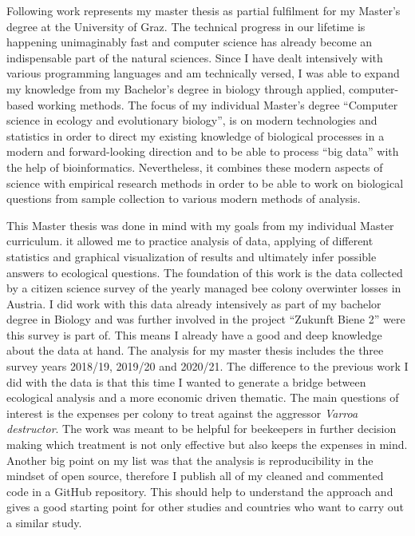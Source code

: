 \label{sec:Preface}

Following work represents my master thesis as partial fulfilment for my Master's degree at the University of Graz. The technical progress in our lifetime is happening unimaginably fast and computer science has already become an indispensable part of the natural sciences. Since I have dealt intensively with various programming languages and am technically versed, I was able to expand my knowledge from my Bachelor's degree in biology through applied, computer-based working methods. The focus of my individual Master's degree \enquote{Computer science in ecology and evolutionary biology}, is on modern technologies and statistics in order to direct my existing knowledge of biological processes in a modern and forward-looking direction and to be able to process \enquote{big data} with the help of bioinformatics. Nevertheless, it combines these modern aspects of science with empirical research methods in order to be able to work on biological questions from sample collection to various modern methods of analysis. 

This Master thesis was done in mind with my goals from my individual Master curriculum. it allowed me to practice analysis of data, applying of different statistics and graphical visualization of results and ultimately infer possible answers to ecological questions. The foundation of this work is the data collected by a citizen science survey of the yearly managed bee colony overwinter losses in Austria. I did work with this data already intensively as part of my bachelor degree in Biology and was further involved in the project \enquote{Zukunft Biene 2} were this survey is part of. This means I already have a good and deep knowledge about the data at hand. The analysis for my master thesis includes the three survey years 2018/19, 2019/20 and 2020/21. The difference to the previous work I did with the data is that this time I wanted to generate a bridge between ecological analysis and a more economic driven thematic. The main questions of interest is the expenses per colony to treat against the aggressor \textit{Varroa destructor}. The work was meant to be helpful for beekeepers in further decision making which treatment is not only effective but also keeps the expenses in mind. Another big point on my list was that the analysis is reproducibility in the mindset of open source, therefore I publish all of my cleaned and commented code in a GitHub repository. This should help to understand the approach and gives a good starting point for other studies and countries who want to carry out a similar study.